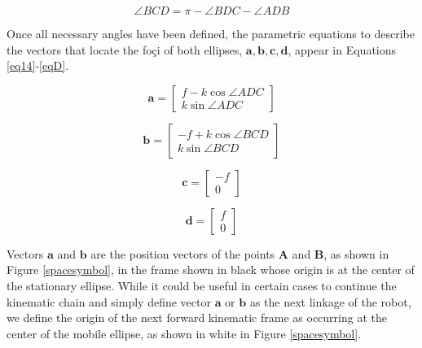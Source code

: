 \documentclass[journal]{IEEEtran}
\begin{document}
\begin{equation} 
\angle BCD = \pi - \angle BDC - \angle ADB
\label{eq13}
\end{equation}

Once all necessary angles have been defined, the parametric equations to describe the vectors that locate the foçi of both ellipses, $\mathbf{a,b,c,d}$, appear in Equations \ref{eq14}-\ref{eqD}.

\begin{equation} 
\mathbf{a} = \begin{bmatrix} f - k \cos \angle ADC \\ k \sin \angle ADC \end{bmatrix}
\label{eq14}
\end{equation}

\begin{equation} 
\mathbf{b} = \begin{bmatrix} -f + k \cos \angle BCD \\ k \sin \angle BCD \end{bmatrix}
\label{eq15}
\end{equation}

\begin{equation} 
\mathbf{c} = \begin{bmatrix} -f \\ 0 \end{bmatrix}
\label{eqC}
\end{equation}

\begin{equation} 
\mathbf{d} = \begin{bmatrix} f \\ 0 \end{bmatrix}
\label{eqD}
\end{equation}

Vectors $\mathbf{a}$ and $\mathbf{b}$ are the position vectors of the points $\mathbf{A}$ and $\mathbf{B}$, as shown in Figure \ref{spacesymbol}, in the frame shown in black whose origin is at the center of the stationary ellipse. While it could be useful in certain cases to continue the kinematic chain and simply define vector $\mathbf{a}$ or $\mathbf{b}$ as the next linkage of the robot, we define the origin of the next forward kinematic frame as occurring at the center of the mobile ellipse, as shown in white in Figure \ref{spacesymbol}. 
\end{document}

